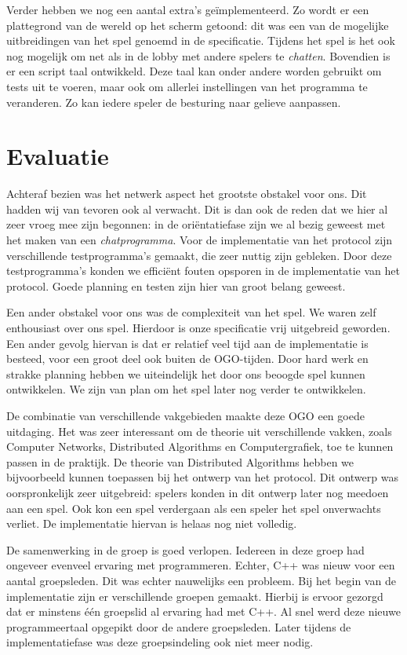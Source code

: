 \documentclass[a4paper,11pt, twoside]{article}
\begin{document}
    Verder hebben we nog een aantal extra's ge\"implementeerd. Zo wordt er een plattegrond van de wereld op het scherm getoond: dit was een van de mogelijke uitbreidingen van het spel genoemd in de specificatie. Tijdens het spel is het ook nog mogelijk om net als in de lobby met andere spelers te \emph{chatten}. Bovendien is er een script taal ontwikkeld. Deze taal kan onder andere worden gebruikt om tests uit te voeren, maar ook om allerlei instellingen van het programma te veranderen. Zo kan iedere speler de besturing naar gelieve aanpassen.

    \section{Evaluatie}
    Achteraf bezien was het netwerk aspect het grootste obstakel voor ons. Dit hadden wij van tevoren ook al verwacht. Dit is dan ook de reden dat we hier al zeer vroeg mee zijn begonnen: in de ori\"entatiefase zijn we al bezig geweest met het maken van een \emph{chatprogramma}. Voor de implementatie van het protocol zijn verschillende testprogramma's gemaakt, die zeer nuttig zijn gebleken. Door deze testprogramma's konden we effici\"ent fouten opsporen in de implementatie van het protocol. Goede planning en testen zijn hier van groot belang geweest.

    Een ander obstakel voor ons was de complexiteit van het spel. We waren zelf enthousiast over ons spel. Hierdoor is onze specificatie vrij uitgebreid geworden. Een ander gevolg hiervan is dat er relatief veel tijd aan de implementatie is besteed, voor een groot deel ook buiten de OGO-tijden. Door hard werk en strakke planning hebben we uiteindelijk het door ons beoogde spel kunnen ontwikkelen. We zijn van plan om het spel later nog verder te ontwikkelen.

    De combinatie van verschillende vakgebieden maakte deze OGO een goede uitdaging. Het was zeer interessant om de theorie uit verschillende vakken, zoals Computer Networks, Distributed Algorithms en Computergrafiek, toe te kunnen passen in de praktijk. De theorie van Distributed Algorithms hebben we bijvoorbeeld kunnen toepassen bij het ontwerp van het protocol. Dit ontwerp was oorspronkelijk zeer uitgebreid: spelers konden in dit ontwerp later nog meedoen aan een spel. Ook kon een spel verdergaan als een speler het spel onverwachts verliet. De implementatie hiervan is helaas nog niet volledig.

    De samenwerking in de groep is goed verlopen. Iedereen in deze groep had ongeveer evenveel ervaring met programmeren. Echter, C++ was nieuw voor een aantal groepsleden. Dit was echter nauwelijks een probleem. Bij het begin van de implementatie zijn er verschillende groepen gemaakt. Hierbij is ervoor gezorgd dat er minstens \'e\'en groepslid al ervaring had met C++. Al snel werd deze nieuwe programmeertaal opgepikt door de andere groepsleden. Later tijdens de implementatiefase was deze groepsindeling ook niet meer nodig.
    \newpage
\end{document}
